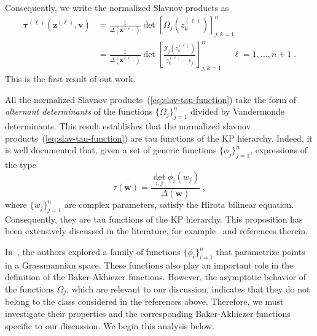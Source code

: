 \documentclass[a4paper,12pt]{amsart}
\begin{document}
Consequently, we write the normalized Slavnov products as 
\begin{equation}
\begin{split}
\label{eq:slav-tau-function}
  \bm{\tau}^{(\ell)}(\bm{z}^{(\ell)}, \bm{v})
  & = \frac{1}{\Delta(\bm{z^{(\ell)}})} \det[\Omega_j(z^{(\ell)}_k) ]_{j,k=1}^n \\
  & = \frac{1}{\Delta(\bm{z}^{(\ell)})} \det\left[\frac{\mathcal{Y}_j(z^{(\ell)}_k)}{z^{(\ell)}_k - v_j} \right]_{j,k=1}^n
  \; \quad \ell = 1, \dots, n+1 \; .
\end{split}
\end{equation}
This is the first result of out work. 

All the normalized Slavnov products~(\ref{eq:slav-tau-function}) take
the form of \emph{alternant determinants} of the functions
\(\{\Omega_j\}_{j=1}^n\) divided by Vandermonde determinants.  This
result establishes that the normalized slavnov
products~(\ref{eq:slav-tau-function}) are tau functions of the KP
hierarchy. Indeed, it is well documented that, given a set of generic
functions \(\{\phi_j\}_{j=1}^n\), expressions of the type
\begin{equation}
\tau(\bm{w}) =
\frac{\det_{i,j} \phi_i(w_j)}{\Delta(\bm{w})}\; ,
\end{equation}
where \(\{w_j\}_{j=1}^n\) are complex parameters, satisfy the Hirota
bilinear equation. Consequently, they are tau functions of the KP
hierarchy.  This proposition has been extensively discussed in the
literature, for example~\cite{Segal:1985aga, Kharchev:1991cy,
  Araujo:2021ghu} and references therein.

In~\cite{Segal:1985aga, Kharchev:1991cy, Alexandrov:2014cwa}, the
authors explored a family of functions \(\{ \phi_i\}_{i=1}^n\) that
parametrize points in a Grassmannian space. These functions also play
an important role in the definition of the Baker-Akhiezer
functions. However, the asymptotic behavior of the functions
\(\Omega_j\), which are relevant to our discussion, indicates that
they do not belong to the class considered in the references above.
Therefore, we must investigate their properties and the corresponding
Baker-Akhiezer functions specific to our discussion.  We begin this
analysis below.
\end{document}
